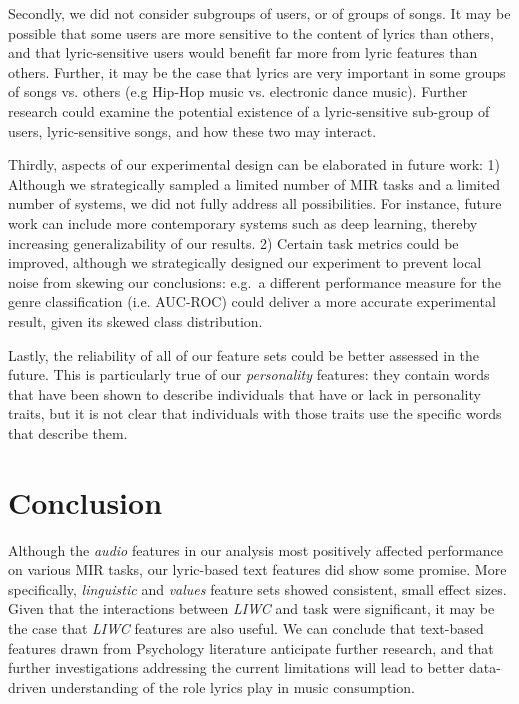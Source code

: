 \documentclass{article}
\begin{document}
Secondly, we did not consider subgroups of users, or of groups of songs. It may be possible that some users are more sensitive to the content of lyrics than others, and that lyric-sensitive users would benefit far more from lyric features than others. Further, it may be the case that lyrics are very important in some groups of songs vs. others (e.g Hip-Hop music vs. electronic dance music). Further research could examine the potential existence of a lyric-sensitive sub-group of users, lyric-sensitive songs, and how these two may interact.

Thirdly, aspects of our experimental design can be elaborated in future work: 1) Although we strategically sampled a limited number of MIR tasks and a limited number of systems, we  did not fully address all possibilities. For instance, future work can include more contemporary systems such as deep learning, thereby increasing generalizability of our results. 2) Certain task metrics could be improved, although we strategically designed our experiment to prevent local noise from skewing our conclusions: e.g.\ a different performance measure for the genre classification (i.e. AUC-ROC) could deliver a more accurate experimental result, given its skewed class distribution.

Lastly, the reliability of all of our feature sets could be better assessed in the future. This is particularly true of our \emph{personality} features: they contain words that have been shown to describe individuals that have or lack in personality traits, but it is not clear that individuals with those traits use the specific words that describe them. 

\section{Conclusion}\label{sec:conclusion}

Although the \emph{audio} features in our analysis most positively affected performance on various MIR tasks, our lyric-based text features did show some promise. More specifically, \emph{linguistic} and \emph{values} feature sets showed consistent, small effect sizes. Given that the interactions between \emph{LIWC} and task were significant, it may be the case that \emph{LIWC} features are also useful. We can conclude that text-based features drawn from Psychology literature anticipate further research, and that further investigations addressing the current limitations will lead to better data-driven understanding of the role lyrics play in music consumption.
\end{document}
